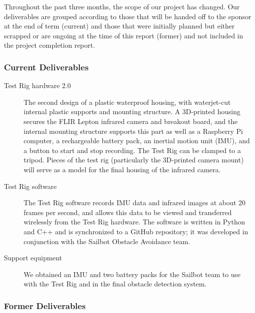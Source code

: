 
\iffalse
This is a direct follow-up from the details contained in the Project Proposal section. The list can describe the final state of each item in the list, any differences between the original deliverables and the actual deliverables, and in what form the Project Sponsor can expect to receive the Deliverable from the Team Members.
\fi

Throughout the past three months, the scope of our project has changed. Our deliverables are grouped according to those that will be handed off to the sponsor at the end of term (current) and those that were initially planned but either scrapped or are ongoing at the time of this report (former) and not included in the project completion report.

\subsubsection{\label{sec:projectdeliverables:listofdeliverables:currentdeliverables}Current Deliverables}

\begin{description}
\item[Test Rig hardware 2.0] The second design of a plastic waterproof housing, with waterjet-cut internal plastic supports and mounting structure. A 3D-printed housing secures the FLIR Lepton infrared camera and breakout board, and the internal mounting structure supports this part as well as a Raspberry Pi computer, a rechargeable battery pack, an inertial motion unit (IMU), and a button to start and stop recording. The Test Rig can be clamped to a tripod. Pieces of the test rig (particularly the 3D-printed camera mount) will serve as a model for the final housing of the infrared camera.
\item[Test Rig software] The Test Rig software records IMU data and infrared images at about 20 frames per second, and allows this data to be viewed and transferred wirelessly from the Test Rig hardware. The software is written in Python and C++ and is synchronized to a GitHub repository; it was developed in conjunction with the Sailbot Obstacle Avoidance team.
\item[Support equipment] We obtained an IMU and two battery packs for the Sailbot team to use with the Test Rig and in the final obstacle detection system.
\end{description}

\subsubsection{\label{sec:projectdeliverables:listofdeliverables:formerdeliverables}Former Deliverables}

